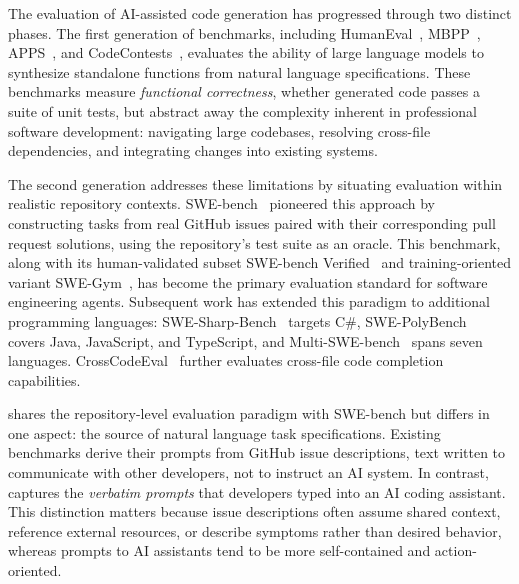 The evaluation of AI-assisted code generation has progressed through two distinct phases. The first generation of benchmarks, including HumanEval~\cite{chenEvaluatingLargeLanguage2021}, MBPP~\cite{austinProgramSynthesisLarge2021}, APPS~\cite{hendrycksMeasuringCodingChallenge2021}, and CodeContests~\cite{liCompetitionlevelCodeGeneration2022}, evaluates the ability of large language models to synthesize standalone functions from natural language specifications. These benchmarks measure \emph{functional correctness}, whether generated code passes a suite of unit tests, but abstract away the complexity inherent in professional software development: navigating large codebases, resolving cross-file dependencies, and integrating changes into existing systems.

The second generation addresses these limitations by situating evaluation within realistic repository contexts. SWE-bench~\cite{jimenezSWEbenchCanLanguage2024} pioneered this approach by constructing tasks from real GitHub issues paired with their corresponding pull request solutions, using the repository's test suite as an oracle. This benchmark, along with its human-validated subset SWE-bench Verified~\cite{IntroducingSWEbenchVerified} and training-oriented variant SWE-Gym~\cite{panTrainingSoftwareEngineering2025}, has become the primary evaluation standard for software engineering agents. Subsequent work has extended this paradigm to additional programming languages: SWE-Sharp-Bench~\cite{mhatreSWESharpBenchReproducibleBenchmark2025} targets C\#, SWE-PolyBench~\cite{rashidSWEPolyBenchMultilanguageBenchmark2025} covers Java, JavaScript, and TypeScript, and Multi-SWE-bench~\cite{zanMultiSWEbenchMultilingualBenchmark2025} spans seven languages. CrossCodeEval~\cite{dingCrossCodeEvalDiverseMultilingual2023} further evaluates cross-file code completion capabilities.

\benchmark{} shares the repository-level evaluation paradigm with SWE-bench but differs in one aspect: the source of natural language task specifications. Existing benchmarks derive their prompts from GitHub issue descriptions, text written to communicate with other developers, not to instruct an AI system. In contrast, \benchmark{} captures the \emph{verbatim prompts} that developers typed into an AI coding assistant. This distinction matters because issue descriptions often assume shared context, reference external resources, or describe symptoms rather than desired behavior, whereas prompts to AI assistants tend to be more self-contained and action-oriented.


